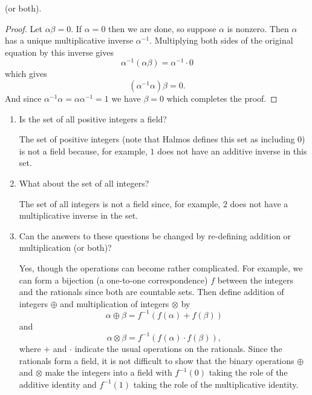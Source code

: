 \begin{enumerate}
  (or both).
  \begin{proof}
    Let $\alpha\beta = 0$. If $\alpha = 0$ then we are done, so
    suppose $\alpha$ is nonzero. Then $\alpha$ has a unique
    multiplicative inverse $\alpha^{-1}$. Multiplying both sides of
    the original equation by this inverse gives
    \begin{equation*}
      \alpha^{-1}(\alpha\beta) = \alpha^{-1}\cdot0
    \end{equation*}
    which gives
    \begin{equation*}
      (\alpha^{-1}\alpha)\beta = 0.
    \end{equation*}
    And since $\alpha^{-1}\alpha = \alpha\alpha^{-1} = 1$ we have
    $\beta = 0$ which completes the proof.
  \end{proof}
\end{enumerate}

\begin{enumerate}
\item Is the set of all positive integers a field?
  \begin{solution}
    The set of positive integers (note that Halmos defines this set as
    including $0$) is not a field because, for example, $1$ does not
    have an additive inverse in this set.
  \end{solution}
\item What about the set of all integers?
  \begin{solution}
    The set of all integers is not a field since, for example, $2$
    does not have a multiplicative inverse in the set.
  \end{solution}
\item Can the answers to these questions be changed by re-defining
  addition or multiplication (or both)?
  \begin{solution}
    Yes, though the operations can become rather complicated. For
    example, we can form a bijection (a one-to-one correspondence) $f$
    between the integers and the rationals since both are countable
    sets. Then define addition of integers $\oplus$ and multiplication
    of integers $\otimes$ by
    \begin{equation*}
      \alpha\oplus\beta = f^{-1}(f(\alpha)+f(\beta))
    \end{equation*}
    and
    \begin{equation*}
      \alpha\otimes\beta = f^{-1}(f(\alpha)\cdot f(\beta)),
    \end{equation*}
    where $+$ and $\cdot$ indicate the usual operations on the
    rationals. Since the rationals form a field, it is not difficult
    to show that the binary operations $\oplus$ and $\otimes$ make the
    integers into a field with $f^{-1}(0)$ taking the role of the
    additive identity and $f^{-1}(1)$ taking the role of the
    multiplicative identity.
  \end{solution}
\end{enumerate}

